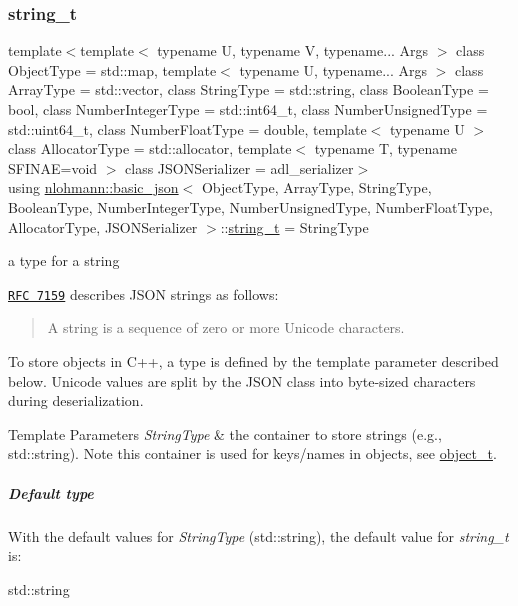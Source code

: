 \subsubsection{\texorpdfstring{string\+\_\+t}{string\_t}}
{\footnotesize\ttfamily template$<$template$<$ typename U, typename V, typename... Args $>$ class Object\+Type = std\+::map, template$<$ typename U, typename... Args $>$ class Array\+Type = std\+::vector, class String\+Type  = std\+::string, class Boolean\+Type  = bool, class Number\+Integer\+Type  = std\+::int64\+\_\+t, class Number\+Unsigned\+Type  = std\+::uint64\+\_\+t, class Number\+Float\+Type  = double, template$<$ typename U $>$ class Allocator\+Type = std\+::allocator, template$<$ typename T, typename S\+F\+I\+N\+A\+E=void $>$ class J\+S\+O\+N\+Serializer = adl\+\_\+serializer$>$ \\
using \mbox{\hyperlink{classnlohmann_1_1basic__json}{nlohmann\+::basic\+\_\+json}}$<$ Object\+Type, Array\+Type, String\+Type, Boolean\+Type, Number\+Integer\+Type, Number\+Unsigned\+Type, Number\+Float\+Type, Allocator\+Type, J\+S\+O\+N\+Serializer $>$\+::\mbox{\hyperlink{classnlohmann_1_1basic__json_a61f8566a1a85a424c7266fb531dca005}{string\+\_\+t}} =  String\+Type}



a type for a string 

\href{http://rfc7159.net/rfc7159}{\tt R\+FC 7159} describes J\+S\+ON strings as follows\+: \begin{quote}
A string is a sequence of zero or more Unicode characters. \end{quote}


To store objects in C++, a type is defined by the template parameter described below. Unicode values are split by the J\+S\+ON class into byte-\/sized characters during deserialization.


\begin{DoxyTemplParams}{Template Parameters}
{\em String\+Type} & the container to store strings (e.\+g., {\ttfamily std\+::string}). Note this container is used for keys/names in objects, see \mbox{\hyperlink{classnlohmann_1_1basic__json_aa1eb13d5aa86f80cbee6c58e90fbaf49}{object\+\_\+t}}.\\
\hline
\end{DoxyTemplParams}
\subparagraph*{Default type}

With the default values for {\itshape String\+Type} ({\ttfamily std\+::string}), the default value for {\itshape string\+\_\+t} is\+:


\begin{DoxyCode}
std::string
\end{DoxyCode}


